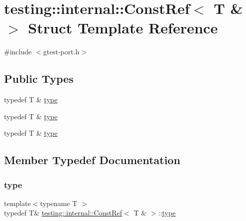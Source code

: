 \hypertarget{structtesting_1_1internal_1_1_const_ref_3_01_t_01_6_01_4}{}\section{testing\+::internal\+::Const\+Ref$<$ T \& $>$ Struct Template Reference}
\label{structtesting_1_1internal_1_1_const_ref_3_01_t_01_6_01_4}


{\ttfamily \#include $<$gtest-\/port.\+h$>$}

\subsection*{Public Types}
\begin{DoxyCompactItemize}
\item 
typedef T \& \mbox{\hyperlink{structtesting_1_1internal_1_1_const_ref_3_01_t_01_6_01_4_a9f664dd25649a0d260cfb1f610c7a349}{type}}
\item 
typedef T \& \mbox{\hyperlink{structtesting_1_1internal_1_1_const_ref_3_01_t_01_6_01_4_a9f664dd25649a0d260cfb1f610c7a349}{type}}
\item 
typedef T \& \mbox{\hyperlink{structtesting_1_1internal_1_1_const_ref_3_01_t_01_6_01_4_a9f664dd25649a0d260cfb1f610c7a349}{type}}
\end{DoxyCompactItemize}


\subsection{Member Typedef Documentation}
\mbox{\label{structtesting_1_1internal_1_1_const_ref_3_01_t_01_6_01_4_a9f664dd25649a0d260cfb1f610c7a349}} 
\subsubsection{\texorpdfstring{type}{type}\hspace{0.1cm}{\footnotesize\ttfamily [1/3]}}
{\footnotesize\ttfamily template$<$typename T $>$ \\
typedef T\& \mbox{\hyperlink{structtesting_1_1internal_1_1_const_ref}{testing\+::internal\+::\+Const\+Ref}}$<$ T \& $>$\+::\mbox{\hyperlink{structtesting_1_1internal_1_1_const_ref_3_01_t_01_6_01_4_a9f664dd25649a0d260cfb1f610c7a349}{type}}}

